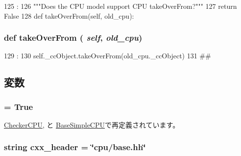 \begin{DoxyCode}
125                               :
126         """Does the CPU model support CPU takeOverFrom?"""
127         return False
128 
    def takeOverFrom(self, old_cpu):
\end{DoxyCode}
\hypertarget{classBaseCPU_1_1BaseCPU_ab5272c636861eb61b25aa639a46cfb77}{
\subsubsection[{takeOverFrom}]{\setlength{\rightskip}{0pt plus 5cm}def takeOverFrom ( {\em self}, \/   {\em old\_\-cpu})}}
\label{classBaseCPU_1_1BaseCPU_ab5272c636861eb61b25aa639a46cfb77}



\begin{DoxyCode}
129                                    :
130         self._ccObject.takeOverFrom(old_cpu._ccObject)
131 
##
\end{DoxyCode}


\subsection{変数}
\hypertarget{classBaseCPU_1_1BaseCPU_a17fa61ac3806b481cafee5593b55e5d0}{
\subsubsection[{abstract}]{ = True}}
\label{classBaseCPU_1_1BaseCPU_a17fa61ac3806b481cafee5593b55e5d0}


\hyperlink{classCheckerCPU_1_1CheckerCPU_a17fa61ac3806b481cafee5593b55e5d0}{CheckerCPU}, と \hyperlink{classBaseSimpleCPU_1_1BaseSimpleCPU_a17fa61ac3806b481cafee5593b55e5d0}{BaseSimpleCPU}で再定義されています。\hypertarget{classBaseCPU_1_1BaseCPU_a17da7064bc5c518791f0c891eff05fda}{
\subsubsection[{cxx\_\-header}]{\setlength{\rightskip}{0pt plus 5cm}string {\bf cxx\_\-header} = \char`\"{}cpu/base.hh\char`\"{}}}
\label{classBaseCPU_1_1BaseCPU_a17da7064bc5c518791f0c891eff05fda}


